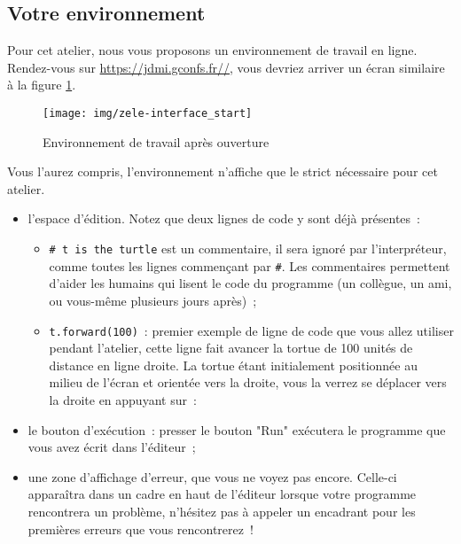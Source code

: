 \documentclass[11pt,a4paper]{article}
\begin{document}
\subsection{Votre environnement}

Pour cet atelier, nous vous proposons un environnement de travail en ligne.
Rendez-vous sur \url{https://jdmi.gconfs.fr//}, vous devriez arriver un
écran similaire à la figure \ref{fig:zeleinterfacestart}.

\begin{figure}
    \centering
    \texttt{[image: img/zele-interface\_start]}
    \caption{Environnement de travail après ouverture}
    \label{fig:zeleinterfacestart}
\end{figure}

Vous l'aurez compris, l'environnement n'affiche que le strict nécessaire pour
cet atelier.

\begin{itemize}
    \item l'espace d'édition. Notez que deux lignes de code y sont déjà
        présentes~:
        \begin{itemize}
            \item \lstinline{# t is the turtle} est un commentaire, il sera
                ignoré par l'interpréteur, comme toutes les lignes commençant
                par \lstinline{#}.  Les commentaires permettent d'aider les
                humains qui lisent le code du programme (un collègue, un ami, ou
                vous-même plusieurs jours après)~;
            \item \lstinline{t.forward(100)}~: premier exemple de ligne de code
                que vous allez utiliser pendant l'atelier, cette ligne fait
                avancer la tortue de 100 unités de distance en ligne droite. La
                tortue étant initialement positionnée au milieu de l'écran et
                orientée vers la droite, vous la verrez se déplacer vers la
                droite en appuyant sur~:
        \end{itemize}
    \item le bouton d'exécution~: presser le bouton "Run" exécutera le programme
        que vous avez écrit dans l'éditeur~;
    \item une zone d'affichage d'erreur, que vous ne voyez pas encore. Celle-ci
        apparaîtra dans un cadre en haut de l'éditeur lorsque votre programme
        rencontrera un problème, n'hésitez pas à appeler un encadrant pour les
        premières erreurs que vous rencontrerez~!
\end{itemize}
\end{document}
